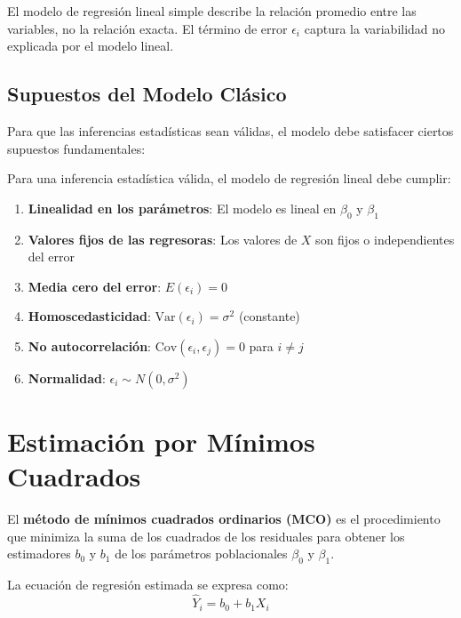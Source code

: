 \begin{remark}
El modelo de regresión lineal simple describe la relación promedio entre las variables, no la relación exacta. El término de error $\epsilon_i$ captura la variabilidad no explicada por el modelo lineal.
\end{remark}

\subsection{Supuestos del Modelo Clásico}

Para que las inferencias estadísticas sean válidas, el modelo debe satisfacer ciertos supuestos fundamentales:

\begin{theorem}
Para una inferencia estadística válida, el modelo de regresión lineal debe cumplir:
\begin{enumerate}
\item \textbf{Linealidad en los parámetros}: El modelo es lineal en $\beta_0$ y $\beta_1$
\item \textbf{Valores fijos de las regresoras}: Los valores de $X$ son fijos o independientes del error
\item \textbf{Media cero del error}: $E(\epsilon_i) = 0$
\item \textbf{Homoscedasticidad}: $\text{Var}(\epsilon_i) = \sigma^2$ (constante)
\item \textbf{No autocorrelación}: $\text{Cov}(\epsilon_i, \epsilon_j) = 0$ para $i \neq j$
\item \textbf{Normalidad}: $\epsilon_i \sim N(0, \sigma^2)$
\end{enumerate}
\end{theorem}

\section{Estimación por Mínimos Cuadrados}

\begin{definition}
El \textbf{método de mínimos cuadrados ordinarios (MCO)} es el procedimiento que minimiza la suma de los cuadrados de los residuales para obtener los estimadores $b_0$ y $b_1$ de los parámetros poblacionales $\beta_0$ y $\beta_1$.
\end{definition}

La ecuación de regresión estimada se expresa como:
$$\hat{Y}_i = b_0 + b_1 X_i$$

